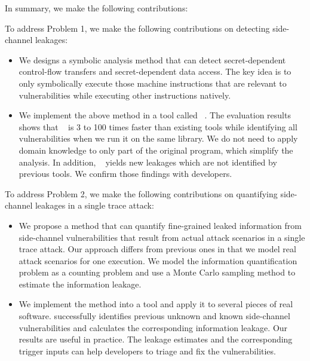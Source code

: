 In summary, we make the following contributions:

To address Problem 1, we make the following contributions on detecting side-channel leakages:

\begin{itemize}
    \item We designs a symbolic analysis method that can detect secret-dependent control-flow transfers and secret-dependent data access. The key idea is to only symbolically execute those machine instructions that are relevant to vulnerabilities while executing other instructions natively.
    \item We implement the above method in a tool called ~\detect{}. The evaluation results shows that ~\detect{}  is 3 to 100 times faster than existing tools while identifying all vulnerabilities when we run it on the same library.  We do not need to apply domain knowledge to only part of the original program, which simplify the analysis. In addition, ~\detect{} yields new leakages which are not identified by previous tools. We confirm those findings with developers.
\end{itemize}

To address Problem 2, we make the following contributions on quantifying side-channel leakages in a single trace attack:


\begin{itemize}
    \item We propose a method that can quantify fine-grained leaked
    information from side-channel vulnerabilities that result from actual attack
    scenarios in a single trace attack. Our approach differs from previous ones in that we
    model real attack scenarios for one execution. 
    We model the information quantification problem as a counting problem 
    and use a Monte Carlo sampling method to estimate the information leakage.
    \item We implement the method into a tool and apply it
    to several pieces of real software. \tool{} successfully identifies
    previous unknown and known side-channel vulnerabilities and calculates the corresponding information leakage. 
    Our results are useful in practice.
    The leakage estimates and the corresponding trigger inputs can 
    help developers to triage and fix the vulnerabilities.
\end{itemize}

